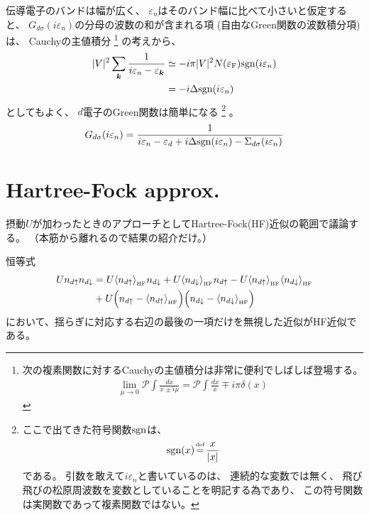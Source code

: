 \documentclass[a4j]{jarticle}
\begin{document}
伝導電子のバンドは幅が広く、
$\varepsilon_{n}$はそのバンド幅に比べて小さいと仮定すると、
$G_{d \sigma}(i \varepsilon_{n})$の分母の波数の和が含まれる項
(自由なGreen関数の波数積分項)は、
Cauchyの主値積分
\footnote{
	次の複素関数に対するCauchyの主値積分は非常に便利でしばしば登場する。
	\begin{align}
		\lim_{\mu \to 0}
		\mathcal{P}
		\int
		\frac{dx}{x \pm i \mu}
		=
		\mathcal{P}
		\int
		\frac{dx}{x}
		\mp i \pi
		\delta(x)
	\end{align}
}
の考えから、
\begin{align}
	|V|^{2}
	\sum_{\bm{k}}
	\frac{1}{
		i \varepsilon_{n} - \varepsilon_{\bm{k}}
	}
	 & \simeq
	-
	i
	\pi
	|V|^{2}
	N(\varepsilon_{\rm F})
	{\rm sgn}(i \varepsilon_{n})
	\nonumber \\
	 & =
	-i \Delta {\rm sgn}(i \varepsilon_{n})
\end{align}
としてもよく、
$d$電子のGreen関数は簡単になる
\footnote{
	ここで出てきた符号関数${\rm sgn}$は、
	\begin{align}
		{\rm sgn}(x)
		\ \!
		{=^{{}^{\hspace{-3mm} \rm def }}}
		\frac{x}{|x|}
	\end{align}
	である。
	引数を敢えて$i \varepsilon_{n}$と書いているのは、
	連続的な変数では無く、
	飛び飛びの松原周波数を変数としていることを明記する為であり、
	この符号関数は実関数であって複素関数ではない。
}
。
\begin{align}
	G_{d \sigma}(i \varepsilon_{n})
	=
	\frac{1}{
		\displaystyle
		i \varepsilon_{n}
		-
		\varepsilon_{d}
		+
		i \Delta {\rm sgn}(i \varepsilon_{n})
		-
		\Sigma_{d\sigma}(i \varepsilon_{n})
	}
\end{align}

\section*{Hartree-Fock approx.}

摂動$U$が加わったときのアプローチとしてHartree-Fock(HF)近似の範囲で議論する。
（本筋から離れるので結果の紹介だけ。）

恒等式
\begin{align}
	U
	n_{d \uparrow}
	n_{d \downarrow}
	 & =
	U
	\langle n_{d \uparrow} \rangle_{{}_{\rm HF}}
	n_{d \downarrow}
	+
	U
	\langle n_{d \downarrow} \rangle_{{}_{\rm HF}}
	n_{d \uparrow}
	-
	U
	\langle n_{d \uparrow} \rangle_{{}_{\rm HF}}
	\langle n_{d \downarrow} \rangle_{{}_{\rm HF}}
	\nonumber \\ &+
	U
	\Big(
	n_{d \uparrow}
	-
	\langle n_{d \uparrow} \rangle_{{}_{\rm HF}}
	\Big)
	\Big(
	n_{d \downarrow}
	-
	\langle n_{d \downarrow} \rangle_{{}_{\rm HF}}
	\Big)
	\label{eqn:HF17}
\end{align}
において、揺らぎに対応する右辺の最後の一項だけを無視した近似がHF近似である。
\end{document}
